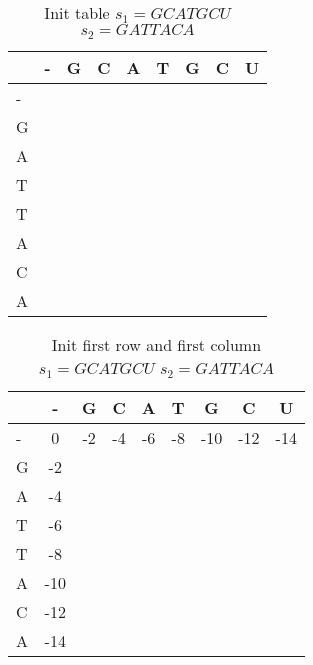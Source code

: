 \documentclass[11pt]{article}
\begin{document}
\begin{table}[ht]
	\caption{Init table $s_1 = GCATGCU$ $s_2 = GATTACA$}
	\label{tab:init_NW}
	\centering

	\begin{tabular}{l|c ccccccc}
	\hline

	\hline
		  & - & G & C & A & T & G & C & U \\
	\hline
	 	- &   &   &   &   &   &   &   &  \\
	 	G &   &   &   &   &   &   &   &  \\
	 	A &   &   &   &   &   &   &   &  \\
	 	T &   &   &   &   &   &   &   &  \\
	 	T &   &   &   &   &   &   &   &  \\
	 	A &   &   &   &   &   &   &   &  \\
	 	C &   &   &   &   &   &   &   &  \\
	 	A &   &   &   &   &   &   &   &  \\
	

	\hline
	\end{tabular}
\end{table}
\begin{table}[ht]
	\caption{Init first row and first column $s_1 = GCATGCU$ $s_2 = GATTACA$}
	\label{tab:init_rw_NW}
	\centering

	\begin{tabular}{l|c ccccccc}
	\hline

	\hline
		  & - & G & C & A & T & G & C & U \\
	\hline
	 	- & 0  & -2& -4& -6& -8&-10&-12&-14\\
	 	G & -2 &   &   &   &   &   &   &   \\
	 	A & -4 &   &   &   &   &   &   &   \\
	 	T & -6 &   &   &   &   &   &   &   \\
	 	T & -8 &   &   &   &   &   &   &   \\
	 	A & -10&   &   &   &   &   &   &   \\
	 	C & -12&   &   &   &   &   &   &   \\
	 	A & -14&   &   &   &   &   &   &   \\
	

	\hline
	\end{tabular}
\end{table}
\end{document}
